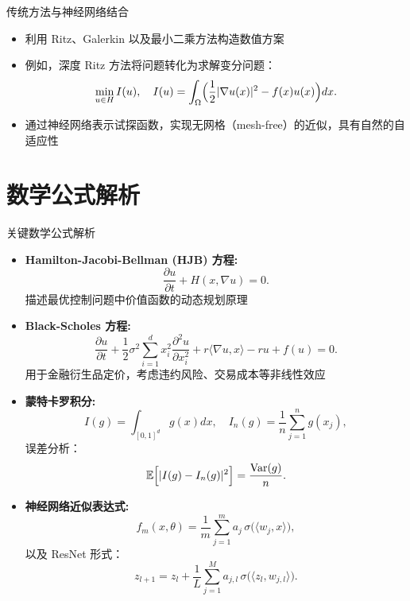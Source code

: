 \documentclass[aspectratio=169]{beamer}
\begin{document}
	\begin{frame}{传统方法与神经网络结合}
		\begin{itemize}
			\item 利用 Ritz、Galerkin 以及最小二乘方法构造数值方案
			\item 例如，深度 Ritz 方法将问题转化为求解变分问题：
				\begin{equation*}
				\min_{u\in H} I(u),\quad I(u)=\int_\Omega \Bigl(\frac{1}{2}|\nabla u(x)|^2 - f(x)u(x)\Bigr)dx.
				\end{equation*}
			\item 通过神经网络表示试探函数，实现无网格（mesh-free）的近似，具有自然的自适应性
		\end{itemize}
	\end{frame}

	\section{数学公式解析}
	\begin{frame}{关键数学公式解析}
		\begin{itemize}
			\item \textbf{Hamilton-Jacobi-Bellman (HJB) 方程:}
				\begin{equation*}
				\frac{\partial u}{\partial t}+H(x,\nabla u)=0.
				\end{equation*}
				描述最优控制问题中价值函数的动态规划原理
			\item \textbf{Black-Scholes 方程:}
				\begin{equation*}
				\frac{\partial u}{\partial t}+\frac{1}{2}\sigma^2 \sum_{i=1}^{d}x_i^2 \frac{\partial^2 u}{\partial x_i^2}+r\langle \nabla u,x\rangle-ru+f(u)=0.
				\end{equation*}
				用于金融衍生品定价，考虑违约风险、交易成本等非线性效应
			\item \textbf{蒙特卡罗积分:}
				\begin{equation*}
				I(g)=\int_{[0,1]^d}g(x)dx,\quad I_n(g)=\frac{1}{n}\sum_{j=1}^n g(x_j),
				\end{equation*}
				误差分析：
				\begin{equation*}
				\mathbb{E}\Bigl[|I(g)-I_n(g)|^2\Bigr]=\frac{\mathrm{Var}(g)}{n}.
				\end{equation*}
			\item \textbf{神经网络近似表达式:}
				\begin{equation*}
				f_m(x,\theta)=\frac{1}{m}\sum_{j=1}^{m}a_j\,\sigma\bigl(\langle w_j,x\rangle\bigr),
				\end{equation*}
				以及 ResNet 形式：
				\begin{equation*}
				z_{l+1}=z_l+\frac{1}{L}\sum_{j=1}^{M}a_{j,l}\,\sigma\bigl(\langle z_l,w_{j,l}\rangle\bigr).
				\end{equation*}
		\end{itemize}
	\end{frame}
\end{document}
